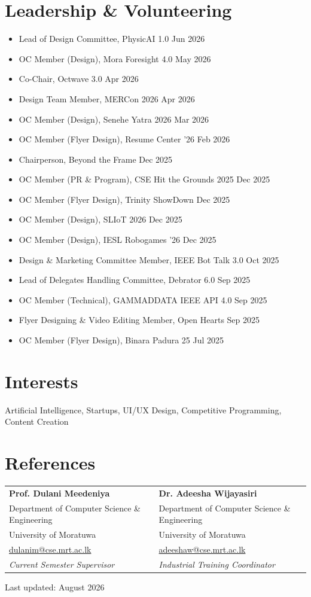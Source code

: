 \documentclass[a4paper,11pt]{article}
\begin{document}
\section*{Leadership \& Volunteering}
\begin{itemize}
    \item Lead of Design Committee, PhysicAI 1.0 \hfill Jun 2026
    \item OC Member (Design), Mora Foresight 4.0 \hfill May 2026
    \item Co-Chair, Octwave 3.0 \hfill Apr 2026
    \item Design Team Member, MERCon 2026 \hfill Apr 2026
    \item OC Member (Design), Senehe Yatra 2026 \hfill Mar 2026
    \item OC Member (Flyer Design), Resume Center '26 \hfill Feb 2026
    \item Chairperson, Beyond the Frame \hfill Dec 2025
    \item OC Member (PR \& Program), CSE Hit the Grounds 2025 \hfill Dec 2025
    \item OC Member (Flyer Design), Trinity ShowDown \hfill Dec 2025
    \item OC Member (Design), SLIoT 2026 \hfill Dec 2025
    \item OC Member (Design), IESL Robogames '26 \hfill Dec 2025
    \item Design \& Marketing Committee Member, IEEE Bot Talk 3.0 \hfill Oct 2025
    \item Lead of Delegates Handling Committee, Debrator 6.0 \hfill Sep 2025
    \item OC Member (Technical), GAMMADDATA IEEE API 4.0 \hfill Sep 2025
    \item Flyer Designing \& Video Editing Member, Open Hearts \hfill Sep 2025
    \item OC Member (Flyer Design), Binara Padura 25 \hfill Jul 2025
\end{itemize}


\section*{Interests}
Artificial Intelligence, Startups, UI/UX Design, Competitive Programming, Content Creation

\section*{References}
\begin{tabularx}{\textwidth}{@{} X X @{}}
\textbf{Prof. Dulani Meedeniya} & \textbf{Dr. Adeesha Wijayasiri} \\
Department of Computer Science \& Engineering & Department of Computer Science \& Engineering \\
University of Moratuwa & University of Moratuwa \\
\href{mailto:dulanim@cse.mrt.ac.lk}{dulanim@cse.mrt.ac.lk} & \href{mailto:adeeshaw@cse.mrt.ac.lk}{adeeshaw@cse.mrt.ac.lk} \\
\textit{Current Semester Supervisor} & \textit{Industrial Training Coordinator}
\end{tabularx}

\vfill
\centerline{\footnotesize Last updated: August 2026}
\end{document}
